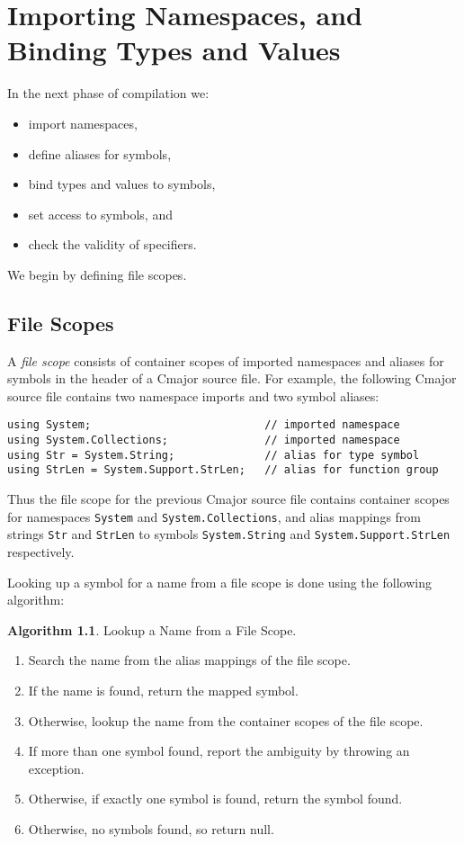 \documentclass[a4paper,oneside,11pt]{book}
\theoremstyle{definition}
\newtheorem{algo}{Algorithm}[section]
\begin{document}
\chapter{Importing Namespaces, and Binding Types and Values}

In the next phase of compilation we:
\begin{itemize}
\item
import namespaces,
\item
define aliases for symbols,
\item
bind types and values to symbols,
\item
set access to symbols, and
\item
check the validity of specifiers.
\end{itemize}
We begin by defining file scopes.

\section{File Scopes}\label{filescope}

A \emph{file scope} consists of container scopes of imported namespaces and aliases for symbols in the header of a Cmajor source file.
For example, the following Cmajor source file contains two namespace imports and two symbol aliases:

\lstset{language=Cmajor}
\begin{lstlisting}[frame=trBL]
using System;                           // imported namespace
using System.Collections;               // imported namespace
using Str = System.String;              // alias for type symbol
using StrLen = System.Support.StrLen;   // alias for function group
\end{lstlisting}

Thus the file scope for the previous Cmajor source file contains container scopes for namespaces \verb|System| and \verb|System.Collections|, and
alias mappings from strings \verb|Str| and \verb|StrLen| to symbols \verb|System.String| and \verb|System.Support.StrLen| respectively.

Looking up a symbol for a name from a file scope is done using the following algorithm:

\begin{algo}\label{lookupfilescope} Lookup a Name from a File Scope.
\begin{enumerate}
\item
Search the name from the alias mappings of the file scope.
\item
If the name is found, return the mapped symbol.
\item
Otherwise, lookup the name from the container scopes of the file scope.
\item
If more than one symbol found, report the ambiguity by throwing an exception.
\item
Otherwise, if exactly one symbol is found, return the symbol found.
\item
Otherwise, no symbols found, so return null.
\end{enumerate}
\end{algo}
\end{document}
